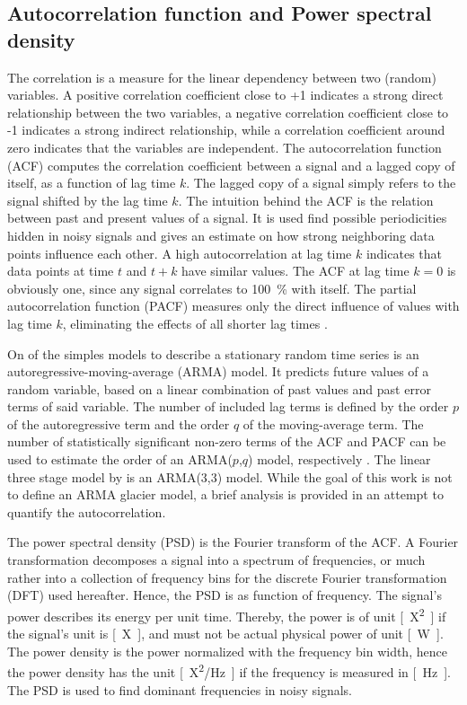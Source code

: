 
    \subsection{Autocorrelation function and Power spectral density} %
    \label{sub:autocorrelation_and_power_spectral_density_setup}

        The correlation is a measure for the linear dependency between two (random) variables. A positive correlation coefficient close to +1 indicates a strong direct relationship between the two variables, a negative correlation coefficient close to -1 indicates a strong indirect relationship, while a correlation coefficient around zero indicates that the variables are independent. The autocorrelation function (ACF) computes the correlation coefficient between a signal and a lagged copy of itself, as a function of lag time $k$. The lagged copy of a signal simply refers to the signal shifted by the lag time $k$. The intuition behind the ACF is the relation between past and present values of a signal. It is used find possible periodicities hidden in noisy signals and gives an estimate on how strong neighboring data points influence each other. A high autocorrelation at lag time $k$ indicates that data points at time $t$ and $t+k$ have similar values. The ACF at lag time $k=0$ is obviously one, since any signal correlates to \SI{100}{\percent} with itself. The partial autocorrelation function (PACF) measures only the direct influence of values with lag time $k$, eliminating the effects of all shorter lag times \citep{BoxJenkins2015}.

        On of the simples models to describe a stationary random time series is an autoregressive-moving-average (ARMA) model. It predicts future values of a random variable, based on a linear combination of past values and past error terms of said variable. The number of included lag terms is defined by the order $p$ of the autoregressive term and the order $q$ of the moving-average term. The number of statistically significant non-zero terms of the ACF and PACF can be used to estimate the order of an ARMA($p$,$q$) model, respectively \citep{BoxJenkins2015}. The linear three stage model by \citet{Roe2014} is an ARMA(3,3) model. While the goal of this work is not to define an ARMA glacier model, a brief analysis is provided in an attempt to quantify the autocorrelation.
        
        The power spectral density (PSD) is the Fourier transform of the ACF. A Fourier transformation decomposes a signal into a spectrum of frequencies, or much rather into a collection of frequency bins for the discrete Fourier transformation (DFT) used hereafter. Hence, the PSD is as function of frequency. The signal's power describes its energy per unit time. Thereby, the power is of unit \si{[X^2]} if the signal's unit is \si{[X]}, and must not be actual physical power of unit \si{[\watt]}. The power density is the power normalized with the frequency bin width, hence the power density has the unit \si{[X^2/\hertz]} if the frequency is measured in \si{[\hertz]}. The PSD is used to find dominant frequencies in noisy signals.

